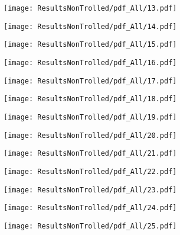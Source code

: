 {  \centerline{\texttt{[image: ResultsNonTrolled/pdf\_All/13.pdf]}  } }


{  \centerline{\texttt{[image: ResultsNonTrolled/pdf\_All/14.pdf]}  } }


{  \centerline{\texttt{[image: ResultsNonTrolled/pdf\_All/15.pdf]}  } }


{  \centerline{\texttt{[image: ResultsNonTrolled/pdf\_All/16.pdf]}  } }


{  \centerline{\texttt{[image: ResultsNonTrolled/pdf\_All/17.pdf]}  } }


{  \centerline{\texttt{[image: ResultsNonTrolled/pdf\_All/18.pdf]}  } }


{  \centerline{\texttt{[image: ResultsNonTrolled/pdf\_All/19.pdf]}  } }


{  \centerline{\texttt{[image: ResultsNonTrolled/pdf\_All/20.pdf]}  } }


{  \centerline{\texttt{[image: ResultsNonTrolled/pdf\_All/21.pdf]}  } }


{  \centerline{\texttt{[image: ResultsNonTrolled/pdf\_All/22.pdf]}  } }


{  \centerline{\texttt{[image: ResultsNonTrolled/pdf\_All/23.pdf]}  } }


{  \centerline{\texttt{[image: ResultsNonTrolled/pdf\_All/24.pdf]}  } }


{  \centerline{\texttt{[image: ResultsNonTrolled/pdf\_All/25.pdf]}  } }


